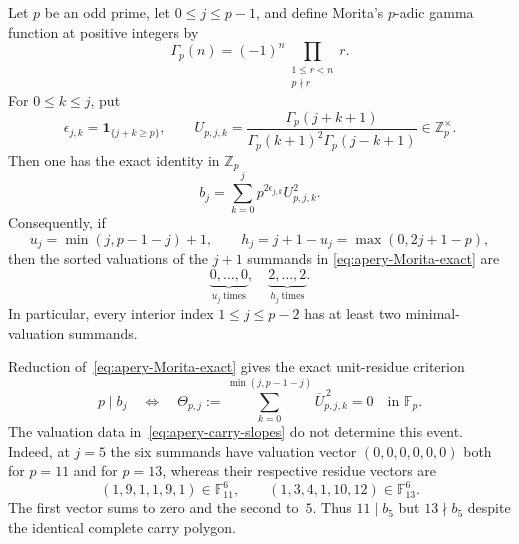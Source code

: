 \begin{proposition}
\label{prop:apery-mellin-carry-polygon}
Let $p$ be an odd prime, let $0\leq j\leq p-1$, and define Morita's
$p$-adic gamma function at positive integers by
\[
 \Gamma_p(n)=(-1)^n
 \prod_{\substack{1\leq r<n\\p\nmid r}}r.
\]
For $0\leq k\leq j$, put
\[
 \epsilon_{j,k}=\mathbf 1_{\{j+k\geq p\}},
 \qquad
 U_{p,j,k}=
 \frac{\Gamma_p(j+k+1)}
 {\Gamma_p(k+1)^2\Gamma_p(j-k+1)}\in\mathbb Z_p^\times.
\]
Then one has the exact identity in $\mathbb Z_p$
\begin{equation}
 \boxed{
 b_j=\sum_{k=0}^j p^{2\epsilon_{j,k}}U_{p,j,k}^2.}
 \label{eq:apery-Morita-exact}
\end{equation}
Consequently, if
\[
 u_j=\min(j,p-1-j)+1,
 \qquad
 h_j=j+1-u_j=\max(0,2j+1-p),
\]
then the sorted valuations of the $j+1$ summands in
\eqref{eq:apery-Morita-exact} are
\begin{equation}
 \underbrace{0,\ldots,0}_{u_j\ \mathrm{times}},
 \quad
 \underbrace{2,\ldots,2}_{h_j\ \mathrm{times}}.
 \label{eq:apery-carry-slopes}
\end{equation}
In particular, every interior index $1\leq j\leq p-2$ has at least two
minimal-valuation summands.

Reduction of~\eqref{eq:apery-Morita-exact} gives the exact unit-residue
criterion
\begin{equation}
 p\mid b_j
 \quad\Longleftrightarrow\quad
 \Theta_{p,j}:=
 \sum_{k=0}^{\min(j,p-1-j)}\overline{U}_{p,j,k}^{\,2}=0
 \quad\text{in }\mathbb F_p.
 \label{eq:apery-unit-residue-criterion}
\end{equation}
The valuation data in~\eqref{eq:apery-carry-slopes} do not determine this
event.  Indeed, at $j=5$ the six summands have valuation vector
$(0,0,0,0,0,0)$ both for $p=11$ and for $p=13$, whereas their respective
residue vectors are
\[
 (1,9,1,1,9,1)\in\mathbb F_{11}^6,
 \qquad
 (1,3,4,1,10,12)\in\mathbb F_{13}^6.
\]
The first vector sums to zero and the second to~$5$.  Thus
$11\mid b_5$ but $13\nmid b_5$ despite the identical complete carry
polygon.
\end{proposition}

